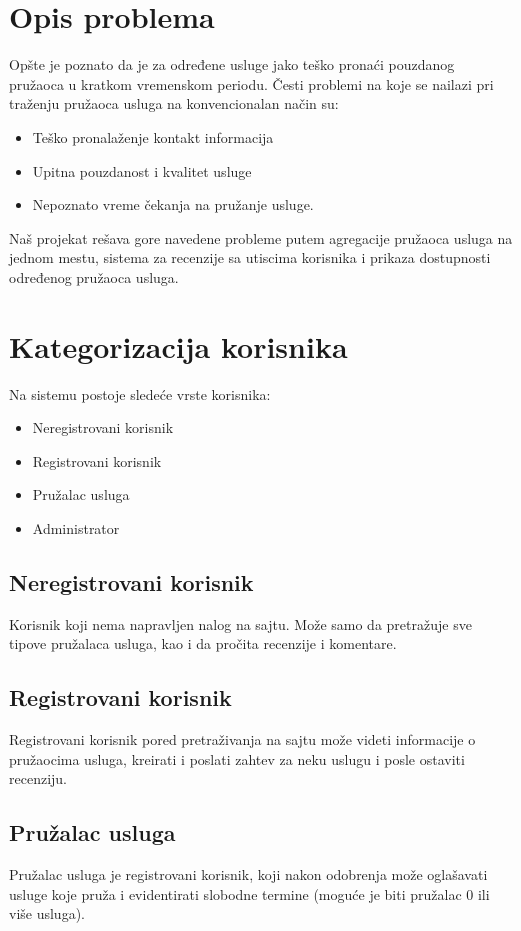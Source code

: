 \documentclass[a4paper,12pt]{report}
\begin{document}
\section{Opis problema}
Opšte je poznato da je za određene usluge jako teško pronaći pouzdanog pružaoca u kratkom vremenskom periodu. Česti problemi na koje se nailazi pri traženju pružaoca usluga na konvencionalan način su: 
    \begin{itemize}
        \item Teško pronalaženje kontakt informacija
        \item Upitna pouzdanost i kvalitet usluge
        \item Nepoznato vreme čekanja na pružanje usluge.
    \end{itemize}
Naš projekat rešava gore navedene probleme putem agregacije pružaoca usluga na jednom mestu, sistema za recenzije sa utiscima korisnika i prikaza dostupnosti određenog pružaoca usluga. 

\section{Kategorizacija korisnika}
Na sistemu postoje sledeće vrste korisnika:
    \begin{itemize}
        \item Neregistrovani korisnik
        \item Registrovani korisnik
        \item Pružalac usluga
        \item Administrator
    \end{itemize}
\newpage
\subsection{Neregistrovani korisnik}
Korisnik koji nema napravljen nalog na sajtu. Može samo da pretražuje sve tipove pružalaca usluga, kao i da pročita recenzije i komentare.
\subsection{Registrovani korisnik}
Registrovani korisnik pored pretraživanja na sajtu može videti informacije o pružaocima usluga, kreirati i poslati zahtev za neku uslugu i posle ostaviti recenziju. 
\subsection{Pružalac usluga}
Pružalac usluga je registrovani korisnik, koji nakon odobrenja može oglašavati usluge koje pruža i evidentirati slobodne termine (moguće je biti pružalac 0 ili više usluga).
\end{document}
